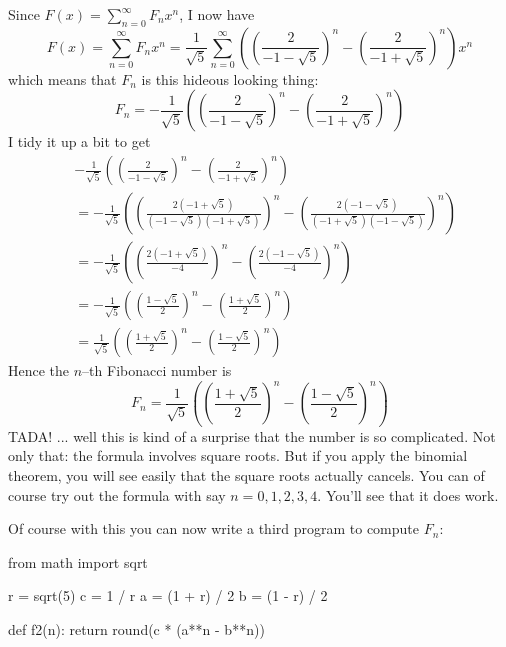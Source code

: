 Since $F(x) = \sum_{n = 0}^\infty F_n x^n$, I now have
\[
F(x) = \sum_{n = 0}^\infty F_n x^n
=
\frac{1}{\sqrt{5}}  
\sum_{n=0}^\infty 
\left(
\left( \frac{2}{-1 - \sqrt{5}} \right)^n
-
\left( \frac{2}{-1 + \sqrt{5}} \right)^n
\right)
x^n
\]
which means that $F_n$ is this hideous looking thing:
\[
F_n =
-\frac{1}{\sqrt{5}}
\left( 
\left( \frac{2}{-1 - \sqrt{5}} \right)^n
-
\left( \frac{2}{-1 + \sqrt{5}} \right)^n
\right)
\]
I tidy it up a bit to get
\begin{align*}
&-\frac{1}{\sqrt{5}} \left( 
\left( \frac{2}{-1 - \sqrt{5}} \right)^n
-
\left( \frac{2}{-1 + \sqrt{5}} \right)^n
\right) \\
&= -
\frac{1}{\sqrt{5}} \left( 
\left( \frac{2(-1 + \sqrt{5})}{(-1 - \sqrt{5})(-1 + \sqrt{5})} \right)^n
-
\left( \frac{2(-1 - \sqrt{5})}{(-1 + \sqrt{5})(-1 - \sqrt{5})} \right)^n
\right) \\
&= -
\frac{1}{\sqrt{5}} \left( 
\left( \frac{2(-1 + \sqrt{5})}{-4} \right)^n
-
\left( \frac{2(-1 - \sqrt{5})}{-4} \right)^n
\right) \\
&= -
\frac{1}{\sqrt{5}} \left( 
\left( \frac{1 - \sqrt{5}}{2} \right)^n
-
\left( \frac{1 + \sqrt{5}}{2} \right)^n
\right) \\
&=
\frac{1}{\sqrt{5}} 
\left( 
\left( \frac{1 + \sqrt{5}}{2} \right)^n
-
\left( \frac{1 - \sqrt{5}}{2} \right)^n
\right) 
\end{align*}
Hence the $n$--th Fibonacci number is
\[
F_n = 
\frac{1}{\sqrt{5}} 
\left( 
\left( \frac{1 + \sqrt{5}}{2} \right)^n
-
\left( \frac{1 - \sqrt{5}}{2} \right)^n
\right)
\]
TADA! ... well this is kind of a surprise
that the number is so complicated.
Not only that:
the formula involves square roots.
But if you apply the binomial theorem, you will see easily that
the square roots actually cancels.
You can of course try out the formula
with say $n = 0, 1, 2, 3, 4$.
You'll see that it does work.

Of course with this you can now write a third program to compute
$F_n$:
\begin{console}[fontsize=\small]
from math import sqrt

r = sqrt(5)
c = 1 / r
a = (1 + r) / 2
b = (1 - r) / 2

def f2(n): 
    return round(c * (a**n - b**n))
\end{console}

